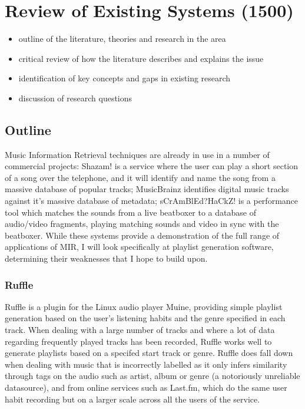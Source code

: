 \chapter{Review of Existing Systems (1500)}
\begin{itemize}
	\item outline of the literature, theories and research in the area
	\item critical review of how the literature describes and explains the issue
	\item identification of key concepts and gaps in existing research
	\item discussion of research questions
\end{itemize}
\section{Outline}
Music Information Retrieval techniques are already in use in a number of commercial projects: Shazam! is a service where the user can play a short section of a song over the telephone, and it will identify and name the song from a massive database of popular tracks; MusicBrainz identifies digital music tracks against it’s massive database of metadata; sCrAmBlEd?HaCkZ! is a performance tool which matches the sounds from a live beatboxer to a database of audio/video fragments, playing matching sounds and video in sync with the beatboxer. While these systems provide a demonstration of the full range of applications of MIR, I will look specifically at playlist generation software, determining their weaknesses that I hope to build upon.
\subsection{Ruffle}
Ruffle is a plugin for the Linux audio player Muine, providing simple playlist generation based on the user’s listening habits and the genre specified in each track. When dealing with a large number of tracks and where a lot of data regarding frequently played tracks has been recorded, Ruffle works well to generate playlists based on a specifed start track or genre. Ruffle does fall down when dealing with music that is incorrectly labelled as it only infers similarity through tags on the audio such as artist, album or genre (a notoriously unreliable datasource), and from online services such as Last.fm, which do the same user habit recording but on a larger scale across all the users of the service.

